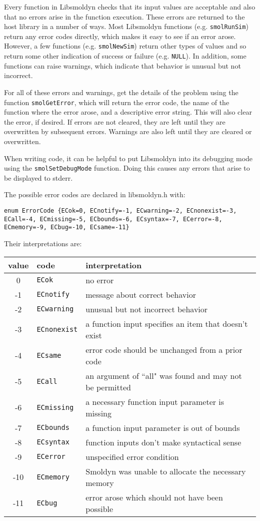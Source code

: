 \documentclass {book}
\newcommand {\ttt} {\texttt}
\begin{document}
Every function in Libsmoldyn checks that its input values are acceptable and also that no errors arise in the function execution. These errors are returned to the host library in a number of ways. Most Libsmoldyn functions (e.g. \ttt{smolRunSim}) return any error codes directly, which makes it easy to see if an error arose. However, a few functions (e.g. \ttt{smolNewSim}) return other types of values and so return some other indication of success or failure (e.g. \ttt{NULL}). In addition, some functions can raise warnings, which indicate that behavior is unusual but not incorrect.

For all of these errors and warnings, get the details of the problem using the function \ttt{smolGetError}, which will return the error code, the name of the function where the error arose, and a descriptive error string. This will also clear the error, if desired. If errors are not cleared, they are left until they are overwritten by subsequent errors. Warnings are also left until they are cleared or overwritten.

When writing code, it can be helpful to put Libsmoldyn into its debugging mode using the \ttt{smolSetDebugMode} function. Doing this causes any errors that arise to be displayed to stderr.

The possible error codes are declared in libsmoldyn.h with:

\begin{lstlisting}
enum ErrorCode {ECok=0, ECnotify=-1, ECwarning=-2, ECnonexist=-3, ECall=-4, ECmissing=-5, ECbounds=-6, ECsyntax=-7, ECerror=-8, ECmemory=-9, ECbug=-10, ECsame=-11}
\end{lstlisting}

Their interpretations are:

\begin{longtable}[c]{cll}
value & code & interpretation\\
\hline
0 & \ttt{ECok} & no error\\
-1 & \ttt{ECnotify} & message about correct behavior\\
-2 & \ttt{ECwarning} & unusual but not incorrect behavior\\
-3 & \ttt{ECnonexist} & a function input specifies an item that doesn't exist\\
-4 & \ttt{ECsame} & error code should be unchanged from a prior code\\
-5 & \ttt{ECall} & an argument of ``all" was found and may not be permitted\\
-6 & \ttt{ECmissing} & a necessary function input parameter is missing\\
-7 & \ttt{ECbounds} & a function input parameter is out of bounds\\
-8 & \ttt{ECsyntax} & function inputs don't make syntactical sense\\
-9 & \ttt{ECerror} & unspecified error condition\\
-10 & \ttt{ECmemory} & Smoldyn was unable to allocate the necessary memory\\
-11 & \ttt{ECbug} & error arose which should not have been possible\\

\end{longtable}
\end{document}
